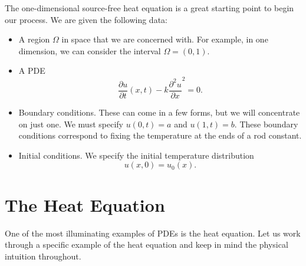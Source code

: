         The one-dimensional source-free heat equation is a great starting point to begin our process.  We are given the following data:
        \begin{itemize}
            \item A region $\Omega$ in space that we are concerned with.  For example, in one dimension, we can consider the interval $\Omega=(0,1)$.
            \item A PDE
            \[
            \frac{\partial u}{\partial t}(x,t) -k \frac{\partial^2 u}{\partial x}^2 = 0.
            \]
            \item Boundary conditions. These can come in a few forms, but we will concentrate on just one. We must specify $u(0,t)=a$ and $u(1,t)=b$.  These boundary conditions correspond to fixing the temperature at the ends of a rod constant.
            \item Initial conditions. We specify the initial temperature distribution
            \[
            u(x,0)=u_0(x).
            \]
        \end{itemize}
    
    
        \section{The Heat Equation}
        One of the most illuminating examples of PDEs is the heat equation.  Let us work through a specific example of the heat equation and keep in mind the physical intuition throughout.
        
